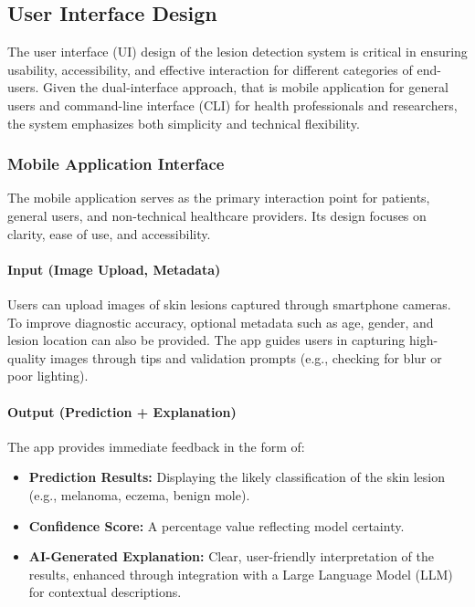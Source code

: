 \documentclass[
  12pt,
  oneside]{article}
\providecommand{\tightlist}{%
  \setlength{\itemsep}{0pt}\setlength{\parskip}{0pt}}
\begin{document}
\subsection{User Interface Design}\label{user-interface-design}

The user interface (UI) design of the lesion detection system is
critical in ensuring usability, accessibility, and effective interaction
for different categories of end-users. Given the dual-interface
approach, that is mobile application for general users and command-line
interface (CLI) for health professionals and researchers, the system
emphasizes both simplicity and technical flexibility.

\subsubsection{Mobile Application
Interface}\label{mobile-application-interface}

The mobile application serves as the primary interaction point for
patients, general users, and non-technical healthcare providers. Its
design focuses on clarity, ease of use, and accessibility.

\paragraph{Input (Image Upload,
Metadata)}\label{input-image-upload-metadata}

Users can upload images of skin lesions captured through smartphone
cameras. To improve diagnostic accuracy, optional metadata such as age,
gender, and lesion location can also be provided. The app guides users
in capturing high-quality images through tips and validation prompts
(e.g., checking for blur or poor lighting).

\paragraph{Output (Prediction +
Explanation)}\label{output-prediction-explanation}

The app provides immediate feedback in the form of:

\begin{itemize}
\tightlist
\item
  \textbf{Prediction Results:} Displaying the likely classification of
  the skin lesion (e.g., melanoma, eczema, benign mole).\\
\item
  \textbf{Confidence Score:} A percentage value reflecting model
  certainty.\\
\item
  \textbf{AI-Generated Explanation:} Clear, user-friendly interpretation
  of the results, enhanced through integration with a Large Language
  Model (LLM) for contextual descriptions.
\end{itemize}
\end{document}
